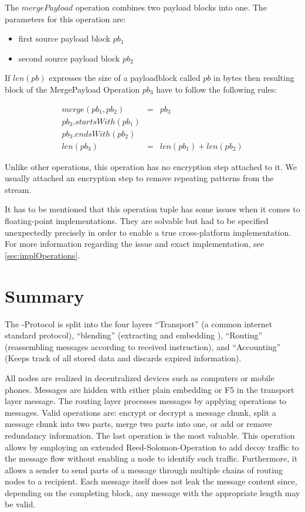 The $mergePayload$ operation combines two payload blocks into one. The parameters for this operation are:

\begin{itemize}
	\item first source payload block $pb_1$
	\item second source payload block $pb_2$
\end{itemize}

If $len(pb)$ expresses the size of a payloadblock called $pb$ in bytes then resulting block of the MergePayload Operation $pb_3$ have to follow the following rules:

\begin{eqnarray}
	merge(pb_1, pb_2) & = & pb_3 \\
	pb_3.startsWith(pb_1)\\
	pb_3.endsWith(pb_2)\\
	len(pb_3) & = & len(pb_1) + len(pb_2)
\end{eqnarray}

Unlike other operations, this operation has no encryption step attached to it. We usually attached an encryption step to remove repeating patterns from the \VortexMessage{} stream.

It has to be mentioned that this operation tuple has some issues when it comes to floating-point implementations. They are solvable but had to be specified unexpectedly precisely in order to enable a true cross-platform implementation. For more information regarding the issue and exact implementation, see \cref{sec:implOperations}.


\section{Summary}
The \MessageVortex{}-Protocol is split into the four layers ``Transport'' (a common internet standard protocol), ``blending'' (extracting and embedding \VortexMessages), ``Routing'' (reassembling messages according to received instruction), and ``Accounting'' (Keeps track of all stored data and discards expired information).

All nodes are realized in decentralized devices such as computers or mobile phones. Messages are hidden with either plain embedding or F5 in the transport layer message. The routing layer processes messages by applying operations to messages. Valid operations are: encrypt or decrypt a message chunk, split a message chunk into two parts, merge two parts into one, or add or remove redundancy information. The last operation is the most valuable. This operation allows by employing an extended Reed-Solomon-Operation to add decoy traffic to the message flow without enabling a node to identify such traffic. Furthermore, it allows a sender to send parts of a message through multiple chains of routing nodes to a recipient. Each message itself does not leak the message content since, depending on the completing block, any message with the appropriate length may be valid.

